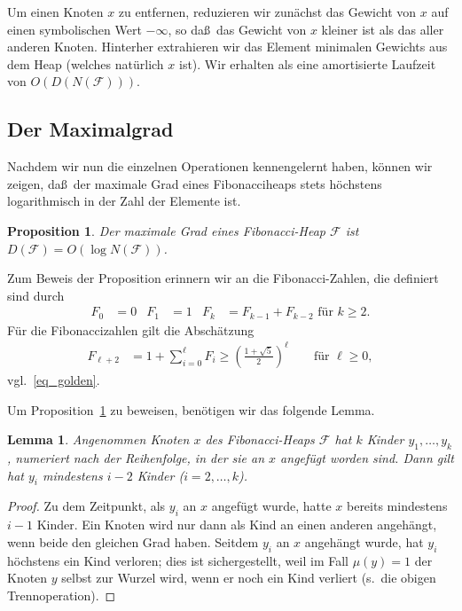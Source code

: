 \documentclass[10pt,reqno]{amsart}
\numberwithin{equation}{section}
\newcommand\cF{\mathcal F}
\newtheorem{lemma}[definition]{Lemma}
\newtheorem{proposition}[definition]{Proposition}
\newcommand\bc[1]{\left({#1}\right)}
\newcommand\bcfr[2]{\bc{\frac{#1}{#2}}}
\newcommand\Prop{Proposition}
\begin{document}
Um einen Knoten $x$ zu entfernen, reduzieren wir zun\"achst das Gewicht von $x$ auf einen symbolischen Wert $-\infty$, so da\ss\ das Gewicht von $x$ kleiner ist als das aller anderen Knoten.
Hinterher extrahieren wir das Element minimalen Gewichts aus dem Heap (welches nat\"urlich $x$ ist).
Wir erhalten als eine amortisierte Laufzeit von $O(D(N(\cF)))$.


\subsection{Der Maximalgrad}\label{sec_fibo_deg}

Nachdem wir nun die einzelnen Operationen kennengelernt haben, k\"onnen wir zeigen, da\ss\ der maximale Grad eines Fibonacciheaps stets h\"ochstens logarithmisch in der Zahl der Elemente ist.

\begin{proposition}\label{prop_fibo}
	Der maximale Grad eines Fibonacci-Heap $\cF$ ist $D(\cF)=O(\log N(\cF))$.
\end{proposition}	

Zum Beweis der Proposition erinnern wir an die Fibonacci-Zahlen, die definiert sind durch
			\begin{align*}
				F_0&=0& F_1&=1& F_k&=F_{k-1}+F_{k-2} \mbox{ f\"ur $k\geq2$}.
			\end{align*}
F\"ur die Fibonaccizahlen gilt die Absch\"atzung
\begin{align}\label{eq_fibo_bound}
				F_{\ell+2}&=1+\sum_{i=0}^\ell F_i\geq\bcfr{1+\sqrt 5}2^\ell\qquad\mbox{f\"ur $\ell\geq0$},
		\end{align}
vgl.\ \eqref{eq_golden}.


Um \Prop~\ref{prop_fibo} zu beweisen, ben\"otigen wir das folgende Lemma.

			\begin{lemma}\label{lem_fibo_child}
			Angenommen Knoten $x$ des Fibonacci-Heaps $\cF$ hat $k$ Kinder $y_1,\ldots,y_k$, numeriert nach der Reihenfolge, in der sie an $x$ angef\"ugt worden sind.
			Dann gilt hat $y_i$ mindestens $i-2$ Kinder ($i=2,\ldots,k$).
		\end{lemma}	
		\begin{proof}
Zu dem Zeitpunkt, als $y_i$ an $x$ angef\"ugt wurde, hatte $x$ bereits mindestens $i-1$ Kinder.
				Ein Knoten wird nur dann als Kind an einen anderen angeh\"angt, wenn beide den gleichen Grad haben.
Seitdem $y_i$ an $x$ angeh\"angt wurde, hat $y_i$ h\"ochstens ein Kind verloren; dies ist sichergestellt, weil im Fall $\mu(y)=1$ der Knoten $y$ selbst zur Wurzel wird, wenn er noch ein Kind verliert (s.\ die obigen Trennoperation).
		\end{proof}
\end{document}
